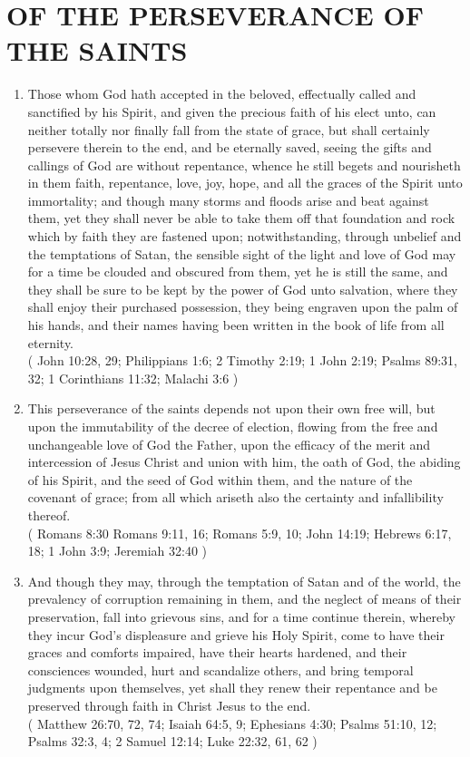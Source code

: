 \documentclass[12pt,a4paper]{book}
\begin{document}
\chapter{OF THE PERSEVERANCE OF THE SAINTS}
\label{ch-per-sai}
\begin{enumerate}
\item Those whom God hath accepted in the beloved, effectually called and sanctified by his Spirit, and given the precious faith of his elect unto, can neither totally nor finally fall from the state of grace, but shall certainly persevere therein to the end, and be eternally saved, seeing the gifts and callings of God are without repentance, whence he still begets and nourisheth in them faith, repentance, love, joy, hope, and all the graces of the Spirit unto immortality; and though many storms and floods arise and beat against them, yet they shall never be able to take them off that foundation and rock which by faith they are fastened upon; notwithstanding, through unbelief and the temptations of Satan, the sensible sight of the light and love of God may for a time be clouded and obscured from them, yet he is still the same, and they shall be sure to be kept by the power of God unto salvation, where they shall enjoy their purchased possession, they being engraven upon the palm of his hands, and their names having been written in the book of life from all eternity.\\
( John 10:28, 29; Philippians 1:6; 2 Timothy 2:19; 1 John 2:19; Psalms 89:31, 32; 1 Corinthians 11:32; Malachi 3:6 )
\item This perseverance of the saints depends not upon their own free will, but upon the immutability of the decree of election, flowing from the free and unchangeable love of God the Father, upon the efficacy of the merit and intercession of Jesus Christ and union with him, the oath of God, the abiding of his Spirit, and the seed of God within them, and the nature of the covenant of grace; from all which ariseth also the certainty and infallibility thereof.\\
( Romans 8:30 Romans 9:11, 16; Romans 5:9, 10; John 14:19; Hebrews 6:17, 18; 1 John 3:9; Jeremiah 32:40 )
\item And though they may, through the temptation of Satan and of the world, the prevalency of corruption remaining in them, and the neglect of means of their preservation, fall into grievous sins, and for a time continue therein, whereby they incur God's displeasure and grieve his Holy Spirit, come to have their graces and comforts impaired, have their hearts hardened, and their consciences wounded, hurt and scandalize others, and bring temporal judgments upon themselves, yet shall they renew their repentance and be preserved through faith in Christ Jesus to the end.\\
( Matthew 26:70, 72, 74; Isaiah 64:5, 9; Ephesians 4:30; Psalms 51:10, 12; Psalms 32:3, 4; 2 Samuel 12:14; Luke 22:32, 61, 62 )
\end{enumerate}
\end{document}
